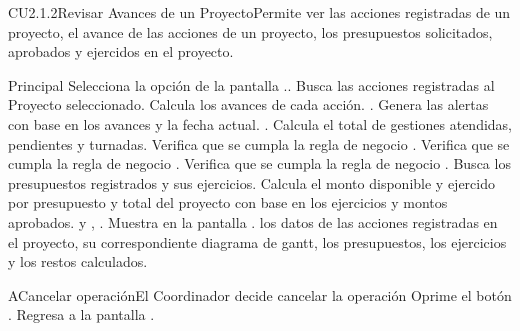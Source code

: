	\begin{UseCase}{CU2.1.2}{Revisar Avances de un Proyecto}{Permite ver las acciones registradas de un proyecto, el avance de las acciones de un proyecto, los presupuestos solicitados, aprobados y ejercidos en el proyecto.}
	\end{UseCase}
	
	
	\begin{UCtrayectoria}{Principal}
		\UCpaso[\UCactor] Selecciona la opción  de la pantalla ..
		\UCpaso Busca las acciones registradas al Proyecto seleccionado.
		\UCpaso Calcula los avances de cada acción. .
		\UCpaso Genera las alertas con base en los avances y la fecha actual. .
		\UCpaso Calcula el total de gestiones atendidas, pendientes y turnadas.
		\UCpaso Verifica que se cumpla la regla de negocio .
		\UCpaso Verifica que se cumpla la regla de negocio .
		\UCpaso Verifica que se cumpla la regla de negocio .
		\UCpaso Busca los presupuestos registrados y sus ejercicios.
		\UCpaso Calcula el monto disponible y ejercido por presupuesto y total del proyecto con base en los ejercicios y montos aprobados. y , .
		\UCpaso Muestra en la pantalla . los datos de las acciones registradas en el proyecto, su correspondiente diagrama de gantt, los presupuestos, los ejercicios y los restos calculados.
		   
		  		
	\end{UCtrayectoria}	

		\begin{UCtrayectoriaA}{A}{Cancelar operación}{El Coordinador decide cancelar la operación}
			\UCpaso[\UCactor] Oprime el botón .
			\UCpaso Regresa a la pantalla . 
		\end{UCtrayectoriaA}